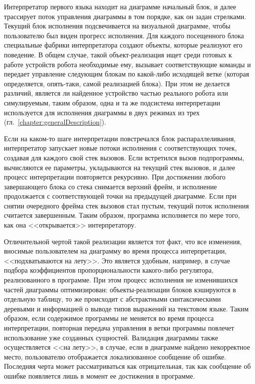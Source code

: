 \documentclass[conference]{IEEEtran}
\begin{document}
Интерпретатор первого языка находит на диаграмме начальный блок, и далее трассирует поток управления диаграммы в том порядке, как он задан стрелками.  Текущий блок исполнения подсвечивается на визуальной диаграмме, чтобы пользователю был виден прогресс исполнения. Для каждого посещенного блока специальные фабрики интерпретатора создают объекты, которые реализуют его поведение. В общем случае, такой объект-реализация ищет среди готовых к работе устройств робота необходимые ему, вызывает соответствующие команды и передает управление следующим блокам по какой-либо исходящей ветке (которая определяется, опять-таки, самой реализацией блока). При этом не делается различий, является ли найденное устройство частью реального робота или симулируемым, таким образом, одна и та же подсистема интерпретации используется для исполнения диаграммы в двух режимах из трех (гл.~\ref{chapter:generalDescription}).

Если на каком-то шаге интерпретации повстречался блок распараллеливания, интерпретатор запускает новые потоки исполнения с соответствующих точек, создавая для каждого свой стек вызовов. Если встретился вызов подпрограммы, вычисляются ее параметры, укладываются на текущий стек вызовов, и далее процесс интерпретации повторяется рекурсивно. При достижении любого завершающего блока со стека снимается верхний фрейм, и исполнение продолжается с соответствующей точки на предыдущей диаграмме. Если при снятии очередного фрейма стек вызовов стал пустым, текущий поток исполнения считается завершенным. Таким образом, программа исполняется по мере того, как она <<открывается>> интерпретатору.

Отличительной чертой такой реализации является тот факт, что все изменения, вносимые пользователем на диаграмму во время процесса интерпретации, <<подхватываются на лету>>. Это является удобным, например, в случае подбора коэффициентов пропорциональности какого-либо регулятора, реализованного в программе. При этом процесс исполнения не изменившихся частей диаграммы оптимизирован: объекты-реализации блоков кэшируются в отдельную таблицу, то же происходит с абстрактными синтаксическими деревьями и информацией о выводе типов выражений на текстовом языке. Таким образом, если содержимое программы не меняется во время процесса интерпретации, повторная передача управления в ветки программы повлечет использование уже созданных сущностей. Валидация диаграммы также осуществляется <<на лету>>, в случае, если в диаграмме найдено некорректное место, пользователю отображается локализованное сообщение об ошибке. Последняя черта может рассматриваться как отрицательная, так как сообщение об ошибке появляется лишь в момент ее достижения в программе.
\end{document}
